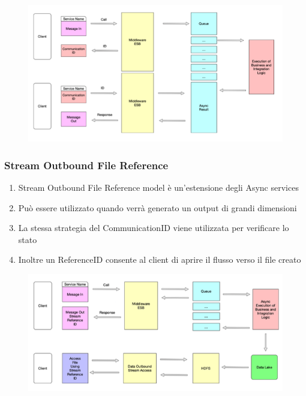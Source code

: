 \documentclass{article}
\begin{document}
\begin{figure}[htp]
    \centering
    \includegraphics[width=\linewidth]{fig/asynchronous_service_call.png}
    \label{fig:Asynchronous service call}
\end{figure}

\subsubsection{Stream Outbound File Reference}
\begin{enumerate}
    \item Stream Outbound File Reference model è un'estensione degli Async services
    \item Può essere utilizzato quando verrà generato un output di grandi dimensioni
    \item La stessa strategia del CommunicationID viene utilizzata per verificare lo stato
    \item Inoltre un ReferenceID consente al client di aprire il flusso verso il file creato
\end{enumerate}

\begin{figure}[htp]
    \centering
    \includegraphics[width=\linewidth]{fig/stream_outbound_file_reference.png}
    \label{fig:Stream Outbound File Reference}
\end{figure}
\end{document}
